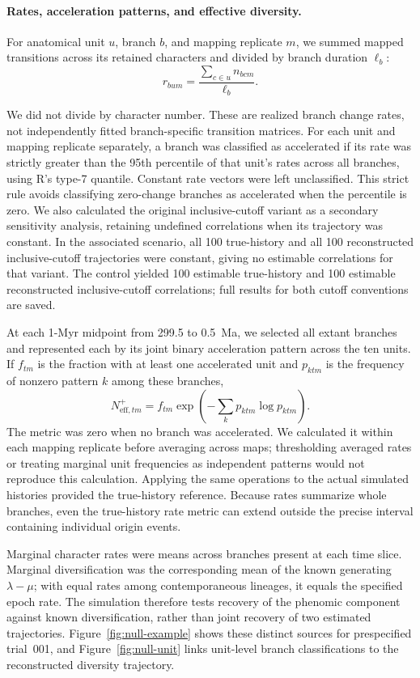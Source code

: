 \begin{samepage}
\paragraph{Rates, acceleration patterns, and effective diversity.}
For anatomical unit $u$, branch $b$, and mapping replicate $m$, we summed
mapped transitions across its retained characters and divided by branch
duration $\ell_b$:
\[
  r_{bum}=\frac{\sum_{c\in u}n_{bcm}}{\ell_b}.
\]
\end{samepage}
We did not divide by character number. These are realized branch change
rates, not independently fitted branch-specific transition matrices.
For each unit and mapping replicate separately, a branch was classified as
accelerated if its rate was strictly greater than the 95th percentile of
that unit's rates across all branches, using R's type-7 quantile.
Constant rate vectors were left unclassified. This strict rule avoids
classifying zero-change branches as accelerated when the percentile is zero.
We also calculated the original inclusive-cutoff variant as a secondary
sensitivity analysis, retaining undefined correlations when its trajectory
was constant. In the associated scenario, all 100 true-history and all 100 reconstructed
inclusive-cutoff trajectories were constant, giving no estimable correlations
for that variant. The control yielded 100 estimable true-history
and 100 estimable reconstructed inclusive-cutoff
correlations; full results for both cutoff conventions are saved.

At each 1-Myr midpoint from 299.5 to 0.5~Ma, we selected all extant branches
and represented each by its joint binary acceleration pattern across the
ten units. If $f_{tm}$ is the fraction with at least one accelerated unit and
$p_{ktm}$ is the frequency of nonzero pattern $k$ among these branches,
\[
  N_{\mathrm{eff},tm}^{+}
  = f_{tm}\exp\left(-\sum_k p_{ktm}\log p_{ktm}\right).
\]
The metric was zero when no branch was accelerated. We calculated it within
each mapping replicate before averaging across maps; thresholding averaged
rates or treating marginal unit frequencies as independent patterns would
not reproduce this calculation. Applying the same operations to the actual
simulated histories provided the true-history reference.
Because rates summarize whole branches, even the true-history rate metric
can extend outside the precise interval containing individual origin events.

Marginal character rates were means across branches present at each time
slice. Marginal diversification was the corresponding mean of the known
generating $\lambda-\mu$; with equal rates among contemporaneous lineages,
it equals the specified epoch rate. The simulation therefore tests recovery
of the phenomic component against known diversification, rather than joint
recovery of two estimated trajectories. Figure~\ref{fig:null-example} shows
these distinct sources for prespecified trial~001, and
Figure~\ref{fig:null-unit} links unit-level branch classifications to the
reconstructed diversity trajectory.

